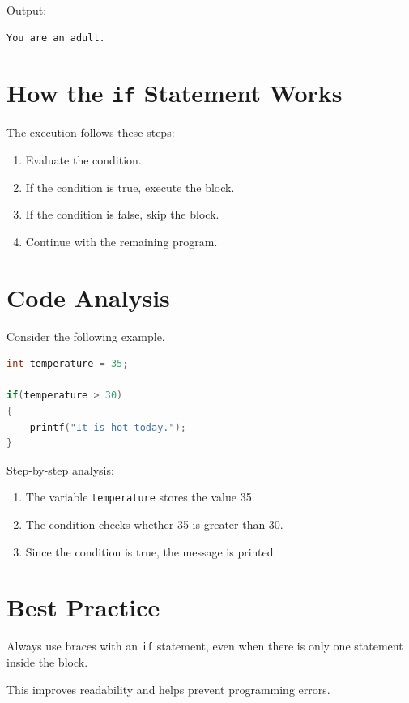 \documentclass[12pt,openany]{book}
\begin{document}
Output:

\begin{lstlisting}
You are an adult.
\end{lstlisting}

\section{How the \texttt{if} Statement Works}

The execution follows these steps:

\begin{enumerate}
    \item Evaluate the condition.
    \item If the condition is true, execute the block.
    \item If the condition is false, skip the block.
    \item Continue with the remaining program.
\end{enumerate}

\section{Code Analysis}

Consider the following example.

\begin{lstlisting}[language=C]
int temperature = 35;

if(temperature > 30)
{
    printf("It is hot today.");
}
\end{lstlisting}

Step-by-step analysis:

\begin{enumerate}
    \item The variable \texttt{temperature} stores the value 35.
    \item The condition checks whether 35 is greater than 30.
    \item Since the condition is true, the message is printed.
\end{enumerate}

\section{Best Practice}

Always use braces with an \texttt{if} statement, even when there is only one statement inside the block.

This improves readability and helps prevent programming errors.
\end{document}
